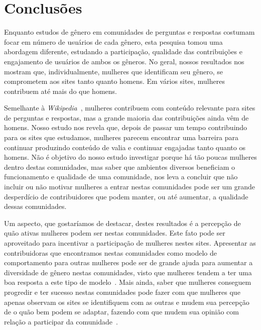 


\chapter{Conclusões}
\label{ch:concl}

Enquanto estudos de gênero em comunidades de perguntas e respostas costumam focar em número de usuários de cada gênero, esta pesquisa tomou uma abordagem diferente, estudando a participação, qualidade das contribuições e engajamento de usuários de ambos os gêneros. No geral, nossos resultados nos mostram que, individualmente, mulheres que identificam seu gênero, se comprometem aos sites tanto quanto homens. Em vários sites, mulheres contribuem até mais do que homens.

Semelhante à \emph{Wikipedia}~\cite{lam2011wp}, mulheres contribuem com conteúdo relevante para sites de perguntas e respostas, mas a grande maioria das contribuições ainda vêm de homens. Nosso estudo nos revela que, depois de passar um tempo contribuindo para os sites que estudamos, mulheres parecem encontrar uma barreira para continuar produzindo conteúdo de valia e continuar engajadas tanto quanto os homens. Não é objetivo do nosso estudo investigar porque há tão poucas mulheres dentro destas comunidades, mas saber que ambientes diversos beneficiam o funcionamento e qualidade de uma comunidade, nos leva a concluir que não incluir ou não motivar mulheres a entrar nestas comunidades pode ser um grande desperdício de contribuidores que podem manter, ou até aumentar, a qualidade dessas comunidades.

Um aspecto, que gostaríamos de destacar, destes resultados é a percepção de quão ativas mulheres podem ser nestas comunidades. Este fato pode ser aproveitado para incentivar a participação de mulheres nestes sites. Apresentar as contribuidoras que encontramos nestas comunidades como modelo de comportamento para outras mulheres pode ser de grande ajuda para aumentar a diversidade de gênero nestas comunidades, visto que mulheres tendem a ter uma boa resposta a este tipo de modelo~\cite{smith1986effect,nixon1999educational}. Mais ainda, saber que mulheres conseguem progredir e ter sucesso nestas comunidades pode fazer com que mulheres que apenas observam os sites se identifiquem com as outras e mudem sua percepção de o quão bem podem se adaptar, fazendo com que mudem sua opinião com relação a participar da comunidade~\cite{ehrlinger2003chronic}.

